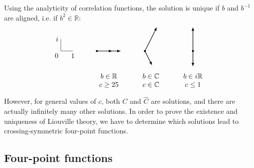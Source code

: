 \documentclass[12pt, a4paper]{article}
\theoremstyle{break}
\begin{document}
Using the analyticity of correlation functions, 
the solution is unique if $b$ and $b^{-1}$ are aligned, i.e. if $b^2\in\mathbb{R}$:
\begin{equation}
 \begin{tikzpicture}[baseline=(current  bounding  box.center), scale = .6]
\draw (0, 2) node[left]{$i$} -- (0, 1) node[below left] {$0$} -- (1, 1) node[below] {$1$};
\draw [thick, latex-latex] (11,3) -- (11,1) node[fill, circle, minimum size = 1mm, inner sep = 0]{} -- (11,-.3);
\draw [thick, latex-latex] (8,3) -- (7,1) node[fill, circle, minimum size = 1mm, inner sep = 0]{}-- (7.6,-.2);
\draw [thick, latex-latex] (5,1) -- (3,1) node[fill, circle, minimum size = 1mm, inner sep = 0]{} -- (4.3,1) ;
\node at (4, -1.5){$\begin{array}{c} b\in \mathbb{R} \\ c\geq 25 \end{array}$};
\node at (7.5, -1.5){$\begin{array}{c} b\in \mathbb{C} \\ c\in\mathbb{C} \end{array}$};
\node at (11, -1.5){$\begin{array}{c} b\in i\mathbb{R} \\ c\leq 1 \end{array}$};
 \end{tikzpicture}
\end{equation}
However, for general values of $c$, both $C$ and $\hat C$ are solutions, and there are actually infinitely many other solutions. In order to prove the existence and uniqueness of Liouville theory, we have to determine which solutions lead to crossing-symmetric four-point functions.


\subsection{Four-point functions}
\end{document}
